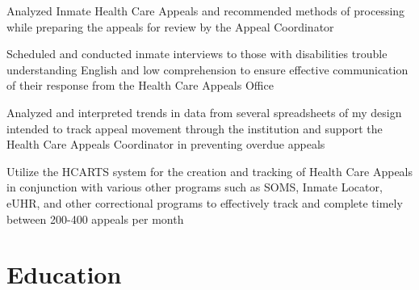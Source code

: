 \documentclass[11pt,a4paper,]{awesome-cv}
\begin{document}
\begin{cventries}
{\begin{cvitems}
\item Analyzed Inmate Health Care Appeals and recommended methods of processing while preparing the appeals for review by the Appeal Coordinator
\item Scheduled and conducted inmate interviews to those with disabilities trouble understanding English and low comprehension to ensure effective communication of their response from the Health Care Appeals Office
\item Analyzed and interpreted trends in data from several spreadsheets of my design intended to track appeal movement through the institution and support the Health Care Appeals Coordinator in preventing overdue appeals
\item Utilize the HCARTS system for the creation and tracking of Health Care Appeals in conjunction with various other programs such as SOMS, Inmate Locator, eUHR, and other correctional programs to effectively track and complete timely between 200-400 appeals per month
\end{cvitems}}
\end{cventries}

\pagebreak

\section{Education}\label{education}
\end{document}
